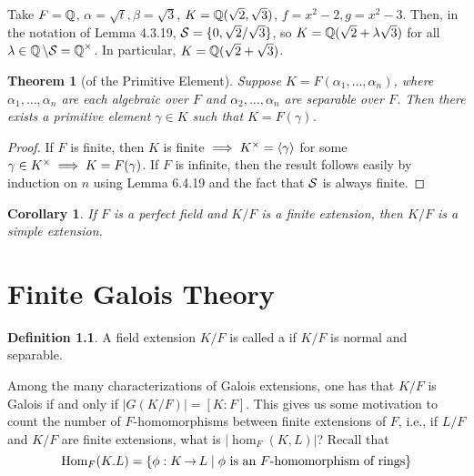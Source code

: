\documentclass[11pt]{book}
\newcounter{counter}
\newtheorem{theorem}[counter]{Theorem}   \newtheorem*{theorem*}{Theorem}   \newtheorem{lemma}[counter]{Lemma}   \newtheorem{corollary}[counter]{Corollary}
\theoremstyle{definition}   \newtheorem{defn}[counter]{Definition} %
\newcommand{\bs}{\setminus}   \newcommand{\A}{\mathcal{A}}   \newcommand{\sy}{\textnormal{Syl}}   \newcommand{\size}[1]{\left| #1 \right|}
\newcommand{\gen}[1]{\left\langle #1 \right\rangle}   \newcommand{\stab}[2]{\tn{Stab}_{#1}(#2)}   \newcommand{\fix}[2]{\tn{Fix}_{#1}(#2)}   \newcommand{\op}{^{\tn{op}}}
\DeclareMathOperator{\ra}{\rightarrow}   \DeclareMathOperator{\Poly}{\mathbf{P}}   \DeclareMathOperator{\spn}{\textnormal{span}}   \DeclareMathOperator{\aut}{\textnormal{Aut}}
\newcommand{\vs}{\vspace{8pt}}
\numberwithin{counter}{chapter}
\begin{document}
\vs

\begin{example}
Take $F = \operatorname{\mathbb{Q}}$, $\alpha = \sqrt{t}, \beta = \sqrt{3}$, $K = \operatorname{\mathbb{Q}}(\sqrt{2},\sqrt{3})$, $f = x^2-2, g = x^2-3$. Then, in the notation of Lemma 4.3.19, $\mathcal{S} = \{0,\sqrt{2}/\sqrt{3}\}$, so $K = \operatorname{\mathbb{Q}}(\sqrt{2} + \lambda \sqrt{3})$ for all $\lambda \in \Q \bs \mc{S} = \Q\x$. In particular, $K = \operatorname{\mathbb{Q}}(\sqrt{2} + \sqrt{3})$. 
\end{example}

\vs

\begin{theorem}[of the Primitive Element]
Suppose $K = F(\alpha_1,\dots,\alpha_n)$, where $\alpha_1,\dots,\alpha_n$ are each algebraic over $F$ and $\alpha_2,\dots,\alpha_n$ are separable over $F$. Then there exists a primitive element $\gamma \in K$ such that $K = F(\gamma)$. 
\end{theorem}

\begin{proof}
If $F$ is finite, then $K$ is finite $\implies K\x = \gen{\gamma}$ for some $\gamma \in K^{\times} \implies K = F(\gamma)$. If $F$ is infinite, then the result follows easily by induction on $n$ using Lemma 6.4.19 and the fact that $\mathcal{S}$ is always finite. 
\end{proof}

\vs

\begin{corollary}
If $F$ is a perfect field and $K/F$ is a finite extension, then $K/F$ is a simple extension. 
\end{corollary}






\chapter{Finite Galois Theory}




\begin{defn}
A field extension $K/F$ is called a  if $K/F$ is normal and separable. 
\end{defn}

Among the many characterizations of Galois extensions, one has that $K/F$ is Galois if and only if $|G(K/F)| = [K : F]$. This gives us some motivation to count the number of $F$-homomorphisms between finite extensions of $F$, i.e., if $L/F$ and $K/F$ are finite extensions, what is $|\hom_F(K,L)|$? Recall that 
	\[\hom_F(K.L) = \{ \phi : K \ra L \mid \phi \tn{ is an }F\tn{-homomorphism of rings} \} \]
	
\end{document}
